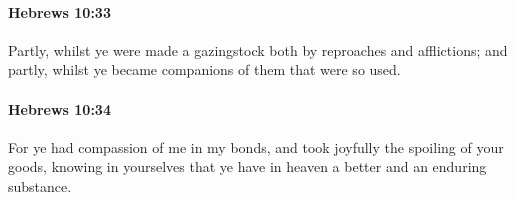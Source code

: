 		\paragraph{Hebrews 10:33} %
			\label{HEBREWS-10-33}

			Partly, whilst ye were made a gazingstock both by reproaches and afflictions; and partly, whilst ye became companions of them that were so used.

			\begin{framed}
			\scriptsize
				\begin{compactdesc}
					\item[SBLG] 
				\end{compactdesc}
			\end{framed}

		\paragraph{Hebrews 10:34} %
			\label{HEBREWS-10-34}

			For ye had compassion of me in my bonds, and took joyfully the spoiling of your goods, knowing in yourselves that ye have in heaven a better and an enduring substance.

